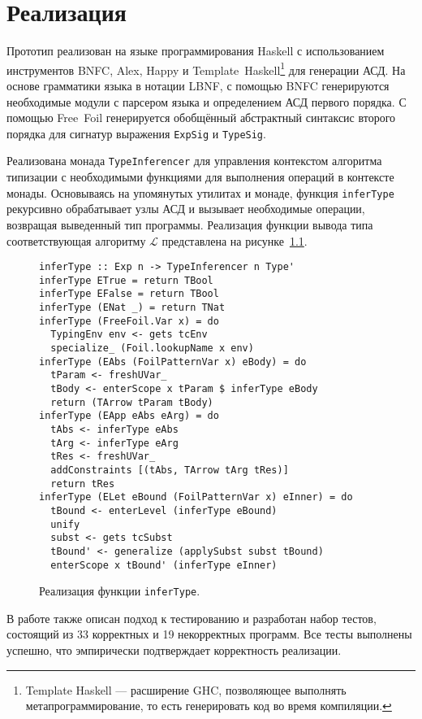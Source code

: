 \chapter{Реализация}
\label{chap:impl}

Прототип реализован на языке программирования Haskell с использованием инструментов BNFC, Alex, Happy и Template~Haskell\footnote{Template Haskell — расширение GHC, позволяющее выполнять метапрограммирование, то есть генерировать код во время компиляции.} для генерации АСД. На основе грамматики языка в нотации LBNF, с помощью BNFC генерируются необходимые модули с парсером языка и определением АСД первого порядка. С помощью Free~Foil генерируется обобщённый абстрактный синтаксис второго порядка для сигнатур выражения \texttt{ExpSig} и \texttt{TypeSig}.

Реализована монада \texttt{TypeInferencer} для управления контекстом алгоритма типизации с необходимыми функциями для выполнения операций в контексте монады. Основываясь на упомянутых утилитах и монаде, функция \texttt{inferType} рекурсивно обрабатывает узлы АСД и вызывает необходимые операции, возвращая выведенный тип программы. Реализация функции вывода типа соответствующая алгоритму $\mathcal{L}$ представлена на рисунке~\ref{fig:inferType}.

\begin{figure}[H]
  \begin{verbatim}
inferType :: Exp n -> TypeInferencer n Type'
inferType ETrue = return TBool
inferType EFalse = return TBool
inferType (ENat _) = return TNat
inferType (FreeFoil.Var x) = do
  TypingEnv env <- gets tcEnv
  specialize_ (Foil.lookupName x env)  
inferType (EAbs (FoilPatternVar x) eBody) = do
  tParam <- freshUVar_
  tBody <- enterScope x tParam $ inferType eBody
  return (TArrow tParam tBody)
inferType (EApp eAbs eArg) = do
  tAbs <- inferType eAbs
  tArg <- inferType eArg
  tRes <- freshUVar_
  addConstraints [(tAbs, TArrow tArg tRes)]
  return tRes
inferType (ELet eBound (FoilPatternVar x) eInner) = do
  tBound <- enterLevel (inferType eBound)
  unify
  subst <- gets tcSubst
  tBound' <- generalize (applySubst subst tBound)
  enterScope x tBound' (inferType eInner)
\end{verbatim}
  \caption[Реализация \texttt{inferType}]{Реализация функции \texttt{inferType}.}
  \label{fig:inferType}
\end{figure}

В работе также описан подход к тестированию и разработан набор тестов, состоящий из 33 корректных и 19 некорректных программ. Все тесты выполнены успешно, что эмпирически подтверждает корректность реализации.
